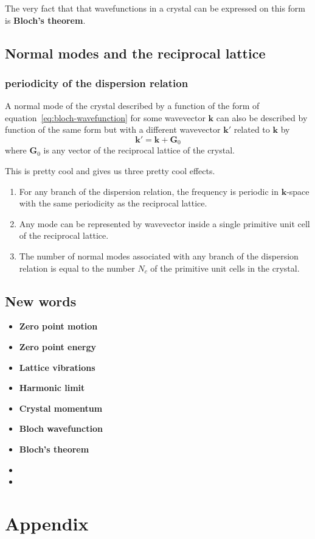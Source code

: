 \documentclass[11pt]{article}
\begin{document}
The very fact that that wavefunctions in a crystal can be expressed on this form is \textbf{Bloch's theorem}.
	
\subsection{Normal modes and the reciprocal lattice}
\subsubsection{periodicity of the dispersion relation}
A normal mode of the crystal described by a function of the form of equation~\ref{eq:bloch-wavefunction} for some wavevector $\pmb{k}$ can also be described by function of the same form but with a different wavevector $\pmb{k}'$ related to $\pmb{k}$ by
\begin{equation}
	\pmb{k}' = \pmb{k} + \pmb{G}_0
\end{equation}
where $\pmb{G}_0$ is any vector of the reciprocal lattice of the crystal.

This is pretty cool and gives us three pretty cool effects.
\begin{enumerate}
	\item For any branch of the dispersion relation, the frequency is periodic in $\pmb{k}$-space with the same periodicity as the reciprocal lattice.
	\item Any mode can be represented by wavevector inside a single primitive unit cell of the reciprocal lattice.
	\item The number of normal modes associated with any branch of the dispersion relation is equal to the number $N_c$ of the primitive unit cells in the crystal.
\end{enumerate}
\newpage
\subsection{New words}
\begin{itemize}
	\item \textbf{Zero point motion}
	\item \textbf{Zero point energy}
	\item \textbf{Lattice vibrations}
	\item \textbf{Harmonic limit}
	\item \textbf{Crystal momentum}
	\item \textbf{Bloch wavefunction}
	\item \textbf{Bloch's theorem}
	\item 
	\item 
\end{itemize}
\newpage

\newpage
\begin{thebibliography}{9}
\end{thebibliography}
\clearpage
\appendix
\section{Appendix}
\end{document}
